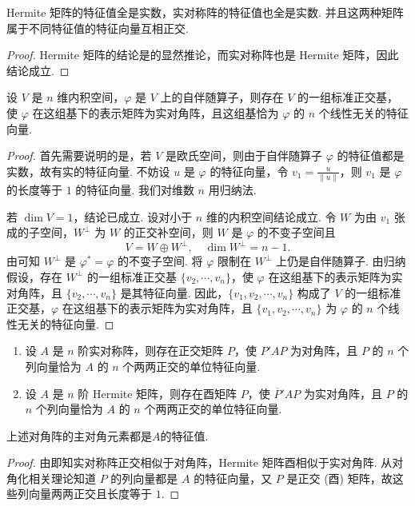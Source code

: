 \documentclass[../../main.tex]{subfiles}%
\begin{document}
\begin{corollary}\label{corollary:Hermite矩阵和实对称矩阵关于特征值的相关性质}
Hermite 矩阵的特征值全是实数，实对称阵的特征值也全是实数. 并且这两种矩阵属于不同特征值的特征向量互相正交.
\end{corollary}
\begin{proof}
Hermite 矩阵的结论是的显然推论，而实对称阵也是 Hermite 矩阵，因此结论成立.
\end{proof}

\begin{theorem}\label{theorem:关于自伴随算子正交对角化}
设 $V$ 是 $n$ 维内积空间，$\varphi$ 是 $V$ 上的自伴随算子，则存在 $V$ 的一组标准正交基，使 $\varphi$ 在这组基下的表示矩阵为实对角阵，且这组基恰为 $\varphi$ 的 $n$ 个线性无关的特征向量.
\end{theorem}
\begin{proof}
首先需要说明的是，若 $V$ 是欧氏空间，则由于自伴随算子 $\varphi$ 的特征值都是实数，故有实的特征向量. 不妨设 $u$ 是 $\varphi$ 的特征向量，令 $v_1 = \frac{u}{\|u\|}$，则 $v_1$ 是 $\varphi$ 的长度等于 $1$ 的特征向量. 我们对维数 $n$ 用归纳法.

若 $\dim V = 1$，结论已成立. 设对小于 $n$ 维的内积空间结论成立. 令 $W$ 为由 $v_1$ 张成的子空间，$W^\perp$ 为 $W$ 的正交补空间，则 $W$ 是 $\varphi$ 的不变子空间且
\[
V = W \oplus W^\perp, \quad \dim W^\perp = n - 1.
\]
由可知 $W^\perp$ 是 $\varphi^* = \varphi$ 的不变子空间. 将 $\varphi$ 限制在 $W^\perp$ 上仍是自伴随算子. 由归纳假设，存在 $W^\perp$ 的一组标准正交基 $\{v_2,\cdots,v_n\}$，使 $\varphi$ 在这组基下的表示矩阵为实对角阵，且 $\{v_2,\cdots,v_n\}$ 是其特征向量. 因此，$\{v_1,v_2,\cdots,v_n\}$ 构成了 $V$ 的一组标准正交基，$\varphi$ 在这组基下的表示矩阵为实对角阵，且 $\{v_1,v_2,\cdots,v_n\}$ 为 $\varphi$ 的 $n$ 个线性无关的特征向量.
\end{proof}

\begin{theorem}\label{theorem:实对称和Hermite矩阵的正交对角化}
\begin{enumerate}
\item 设 $A$ 是 $n$ 阶实对称阵，则存在正交矩阵 $P$，使 $P'AP$ 为对角阵，且 $P$ 的 $n$ 个列向量恰为 $A$ 的 $n$ 个两两正交的单位特征向量.

\item 设 $A$ 是 $n$ 阶 Hermite 矩阵，则存在酉矩阵 $P$，使 $\overline{P}'AP$ 为实对角阵，且 $P$ 的 $n$ 个列向量恰为 $A$ 的 $n$ 个两两正交的单位特征向量.
\end{enumerate}
\end{theorem}
\begin{remark}
上述对角阵的主对角元素都是$A$的特征值.
\end{remark}
\begin{proof}
由即知实对称阵正交相似于对角阵，Hermite 矩阵酉相似于实对角阵. 从对角化相关理论知道 $P$ 的列向量都是 $A$ 的特征向量，又 $P$ 是正交 (酉) 矩阵，故这些列向量两两正交且长度等于 $1$. 
\end{proof}
\end{document}
